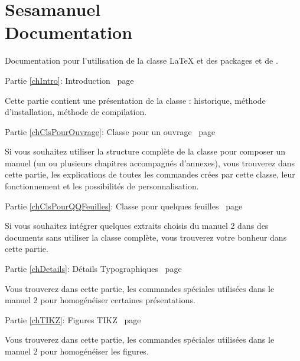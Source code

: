 \documentclass[nocrop]{sesamanuel}
\begin{document}
 
\themaM
{}
\chapter{Sesamanuel\\Documentation}

\begin{commentaire}
Documentation pour l'utilisation de la classe \LaTeX{}  et des packages  et  de \Logosesa{}.

\textcolor{PrerequisTitleColor}{\PrerequisTitleFont 
Partie \ref{chIntro}: Introduction \dotfill\ page \pageref{chIntro}}

Cette partie contient une présentation de la classe : historique, méthode d'installation, méthode de compilation.

\textcolor{PrerequisTitleColor}{\PrerequisTitleFont 
Partie \ref{chClsPourOuvrage}: Classe pour un ouvrage  \dotfill\ page \pageref{chClsPourOuvrage}}

Si vous souhaitez utiliser la structure complète de la classe pour composer un manuel (un ou plusieurs chapitres accompagnés d'annexes), vous trouverez dans cette partie, les explications de toutes les commandes crées par cette classe, leur fonctionnement et les possibilités de personnalisation. 

\textcolor{PrerequisTitleColor}{\PrerequisTitleFont 
Partie \ref{chClsPourQQFeuilles}: Classe pour quelques feuilles  \dotfill\ page \pageref{chClsPourQQFeuilles}}

Si vous souhaitez intégrer quelques extraits choisis du manuel \Logosesa{} 2 dans des documents sans utiliser la classe complète, vous trouverez votre bonheur dans cette partie.

\textcolor{PrerequisTitleColor}{\PrerequisTitleFont 
Partie \ref{chDetails}: Détails Typographiques  \dotfill\ page \pageref{chDetails}}

Vous trouverez dans cette partie, les commandes spéciales utilisées dans le manuel \Logosesa{} 2 pour homogénéiser certaines présentations. 

\textcolor{PrerequisTitleColor}{\PrerequisTitleFont 
Partie \ref{chTIKZ}: Figures TIKZ  \dotfill\ page \pageref{chTIKZ}}


Vous trouverez dans cette partie, les commandes spéciales utilisées dans le manuel \Logosesa{} 2 pour homogénéiser les figures.
\end{commentaire}
\end{document}
